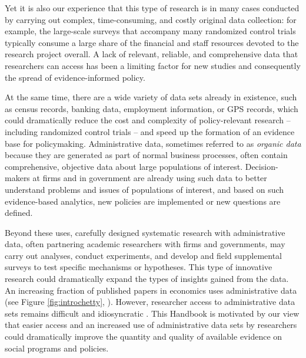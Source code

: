\documentclass[
]{WileySix}
\begin{document}
Yet it is also our experience that this type of research is in many cases conducted by carrying out complex, time-consuming, and costly original data collection: for example, the large-scale surveys that accompany many randomized control trials typically consume a large share of the financial and staff resources devoted to the research project overall. A lack of relevant, reliable, and comprehensive data that researchers can access has been a limiting factor for new studies and consequently the spread of evidence-informed policy.

At the same time, there are a wide variety of data sets already in existence, such as census records, banking data, employment information, or GPS records, which could dramatically reduce the cost and complexity of policy-relevant research -- including randomized control trials -- and speed up the formation of an evidence base for policymaking. Administrative data, sometimes referred to as \emph{organic data} \citep{groves2011} because they are generated as part of normal business processes, often contain comprehensive, objective data about large populations of interest. Decision-makers at firms and in government are already using such data to better understand problems and issues of populations of interest, and based on such evidence-based analytics, new policies are implemented or new questions are defined.

Beyond these uses, carefully designed systematic research with administrative data, often partnering academic researchers with firms and governments, may carry out analyses, conduct experiments, and develop and field supplemental surveys to test specific mechanisms or hypotheses. This type of innovative research could dramatically expand the types of insights gained from the data. An increasing fraction of published papers in economics uses administrative data (see Figure \ref{fig:introchetty}, \citet{chetty2012}). However, researcher access to administrative data sets remains difficult and idiosyncratic \citep{card2010}. This Handbook is motivated by our view that easier access and an increased use of administrative data sets by researchers could dramatically improve the quantity and quality of available evidence on social programs and policies.
\end{document}
